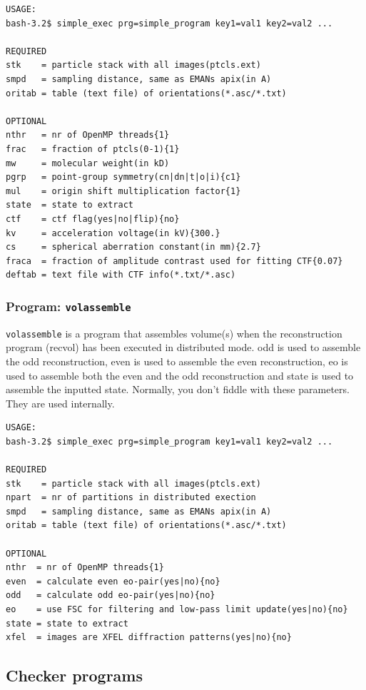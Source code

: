 \documentclass[a4paper,11pt]{article}
\newcommand{\prgname}[1]{\textcolor{NavyBlue}{\texttt{#1}}}
\begin{document}
\begin{verbatim}
USAGE:
bash-3.2$ simple_exec prg=simple_program key1=val1 key2=val2 ...

REQUIRED
stk    = particle stack with all images(ptcls.ext)
smpd   = sampling distance, same as EMANs apix(in A)
oritab = table (text file) of orientations(*.asc/*.txt)

OPTIONAL
nthr   = nr of OpenMP threads{1}
frac   = fraction of ptcls(0-1){1}
mw     = molecular weight(in kD)
pgrp   = point-group symmetry(cn|dn|t|o|i){c1}
mul    = origin shift multiplication factor{1}
state  = state to extract
ctf    = ctf flag(yes|no|flip){no}
kv     = acceleration voltage(in kV){300.}
cs     = spherical aberration constant(in mm){2.7}
fraca  = fraction of amplitude contrast used for fitting CTF{0.07}
deftab = text file with CTF info(*.txt/*.asc)
\end{verbatim}

\subsubsection{Program: \prgname{volassemble}}
\label{volassemble}
\prgname{volassemble} is a program that assembles volume(s) when the reconstruction program (recvol) has been executed in distributed mode. odd is used to assemble the odd reconstruction, even is used to assemble the even reconstruction, eo is used to assemble both the even and the odd reconstruction and state is used to assemble the inputted state. Normally, you don't fiddle with these parameters. They are used internally.

\begin{verbatim}
USAGE:
bash-3.2$ simple_exec prg=simple_program key1=val1 key2=val2 ...

REQUIRED
stk    = particle stack with all images(ptcls.ext)
npart  = nr of partitions in distributed exection
smpd   = sampling distance, same as EMANs apix(in A)
oritab = table (text file) of orientations(*.asc/*.txt)

OPTIONAL
nthr  = nr of OpenMP threads{1}
even  = calculate even eo-pair(yes|no){no}
odd   = calculate odd eo-pair(yes|no){no}
eo    = use FSC for filtering and low-pass limit update(yes|no){no}
state = state to extract
xfel  = images are XFEL diffraction patterns(yes|no){no}
\end{verbatim}

\subsection{Checker programs}
\end{document}
